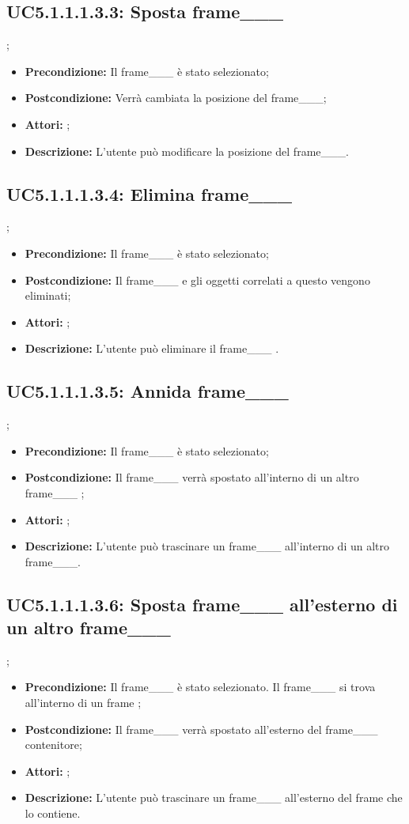 \subsection{ UC5.1.1.1.3.3: Sposta frame___}
;
\begin{itemize}
	\item \textbf{Precondizione:} Il frame___ è stato selezionato;
	\item \textbf{Postcondizione:} Verrà cambiata la posizione del frame___;
	\item \textbf{Attori:} ;
	\item \textbf{Descrizione:} L'utente può modificare la posizione del frame___.
\end{itemize}
\subsection{ UC5.1.1.1.3.4: Elimina frame___}
;
\begin{itemize}
	\item \textbf{Precondizione:} Il frame___ è stato selezionato;
	\item \textbf{Postcondizione:} Il frame___ e gli oggetti correlati a questo vengono eliminati;
	\item \textbf{Attori:} ;
	\item \textbf{Descrizione:} L'utente può eliminare il frame___ .
\end{itemize}
\subsection{ UC5.1.1.1.3.5: Annida frame___}
;
\begin{itemize}
	\item \textbf{Precondizione:} Il frame___ è stato selezionato;
	\item \textbf{Postcondizione:} Il frame___ verrà spostato all'interno di un altro frame___  ;
	\item \textbf{Attori:} ;
	\item \textbf{Descrizione:} L'utente può trascinare un frame___ all'interno di un altro frame___.
\end{itemize}
\subsection{ UC5.1.1.1.3.6: Sposta frame___ all'esterno di un altro frame___  }
;
\begin{itemize}
	\item \textbf{Precondizione:} Il frame___ è stato selezionato. Il frame___ si trova all'interno di un frame ;
	\item \textbf{Postcondizione:} Il frame___ verrà spostato all'esterno del frame___ contenitore;
	\item \textbf{Attori:} ;
	\item \textbf{Descrizione:} L'utente può trascinare un frame___ all'esterno del frame che lo contiene.
\end{itemize}
